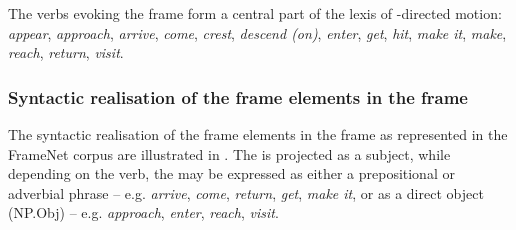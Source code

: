 \documentclass[output=paper,colorlinks,citecolor=brown]{langscibook}
\begin{document}
The verbs evoking the  frame form a central part of the lexis of -directed motion: \textit{appear}, \textit{approach}, \textit{arrive}, \textit{come}, \textit{crest}, \textit{descend (on)}, \textit{enter}, \textit{get}, \textit{hit}, \textit{make it}, \textit{make}, \textit{reach}, \textit{return}, \textit{visit}.

\subsubsection{Syntactic realisation of the frame elements in the  frame}

The syntactic realisation of the frame elements in the  frame as represented in the FrameNet corpus are illustrated in . The  is projected as a subject, while depending on the verb, the  may be expressed as either a prepositional or adverbial phrase -- e.g. \textit{arrive}, \textit{come}, \textit{return}, \textit{get}, \textit{make it}, or as a direct object (NP.Obj) -- e.g. \textit{approach}, \textit{enter}, \textit{reach}, \textit{visit}.
\end{document}
